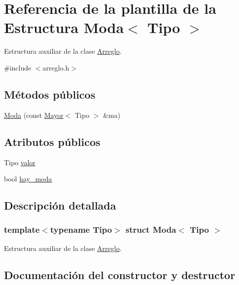 \hypertarget{struct_moda}{}\section{Referencia de la plantilla de la Estructura Moda$<$ Tipo $>$}
\label{struct_moda}


Estructura auxiliar de la clase \hyperlink{class_arreglo}{Arreglo}.  




{\ttfamily \#include $<$arreglo.\+h$>$}

\subsection*{Métodos públicos}
\begin{DoxyCompactItemize}
\item 
\hyperlink{struct_moda_af99f5922d046cc137af7844f7e29c605}{Moda} (const \hyperlink{struct_mayor}{Mayor}$<$ Tipo $>$ \&ma)
\end{DoxyCompactItemize}
\subsection*{Atributos públicos}
\begin{DoxyCompactItemize}
\item 
Tipo \hyperlink{struct_moda_a5b1e37f7ab23196b577cfd4401717a7c}{valor}
\item 
bool \hyperlink{struct_moda_ac79b25a802593339293054d788beef70}{hay\+\_\+moda}
\end{DoxyCompactItemize}


\subsection{Descripción detallada}
\subsubsection*{template$<$typename Tipo$>$\newline
struct Moda$<$ Tipo $>$}

Estructura auxiliar de la clase \hyperlink{class_arreglo}{Arreglo}. 

\subsection{Documentación del constructor y destructor}
\mbox{\label{struct_moda_af99f5922d046cc137af7844f7e29c605}} 
